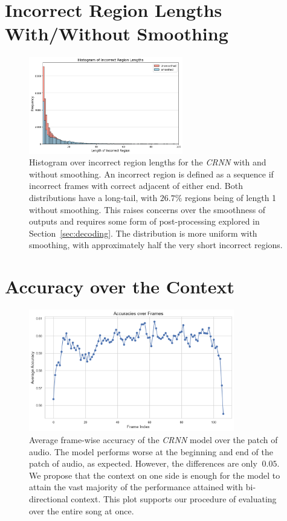 \section{Incorrect Region Lengths With/Without Smoothing}\label{app:histogram_over_region_lengths}

\begin{figure}[H]
    \centering
    \includegraphics[width=0.6\textwidth]{figures/incorrect_region_smoothing_histogram.png}
    \caption{Histogram over incorrect region lengths for the \emph{CRNN} with and without smoothing. An incorrect region is defined as a sequence if incorrect frames with correct adjacent of either end. Both distributions have a long-tail, with $26.7\%$ regions being of length 1 without smoothing. This raises concerns over the smoothness of outputs and requires some form of post-processing explored in Section~\ref{sec:decoding}. The distribution is more uniform with smoothing, with approximately half the very short incorrect regions.}
    \label{fig:histogram_over_region_lengths}
\end{figure}

\section{Accuracy over the Context}\label{app:accuracy_over_context}
\begin{figure}[H]
    \centering
    \includegraphics[width=0.8\textwidth]{figures/accuracy_over_frames.png}
    \caption{Average frame-wise accuracy of the \emph{CRNN} model over the patch of audio. The model performs worse at the beginning and end of the patch of audio, as expected. However, the differences are only $~0.05$. We propose that the context on one side is enough for the model to attain the vast majority of the performance attained with bi-directional context. This plot supports our procedure of evaluating over the entire song at once. }\label{fig:crnn_context}
\end{figure}

